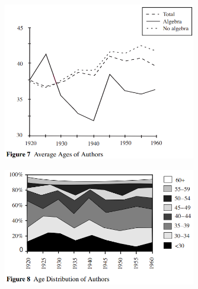 \documentclass[12pt]{article}
\begin{document}
\begin{figure}[H]
    \centering
    \includegraphics[width=0.75\textwidth]{4º Período/História do Pensamento Econômico/Tradução HPE/Tradução Tópico 7.2/figure 7.png}
    \end{figure}

\begin{figure}[H]
    \centering
    \includegraphics[width=0.75\textwidth]{4º Período/História do Pensamento Econômico/Tradução HPE/Tradução Tópico 7.2/figure 8.png}
    \end{figure}
\end{document}
